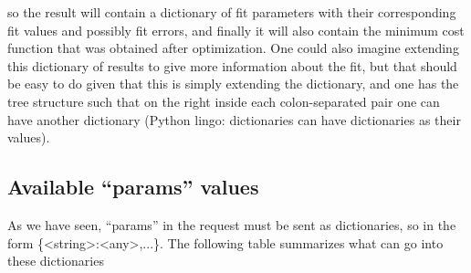 \documentclass[11pt]{article} %
\begin{document}
so the result will contain a dictionary of fit parameters with their corresponding fit values and possibly fit errors, and finally it will also contain the minimum cost function that was obtained after optimization.  One could also imagine extending this dictionary of results to give more information about the fit, but that should be easy to do given that this is simply extending the dictionary, and one has the tree structure such that on the right inside each colon-separated pair one can have another dictionary (Python lingo: dictionaries can have dictionaries as their values). 

\subsection{Available ``params'' values}

As we have seen, ``params'' in the request must be sent as dictionaries, so in the form \{<string>:<any>,...\}. The following table summarizes what can go into these dictionaries
\end{document}
